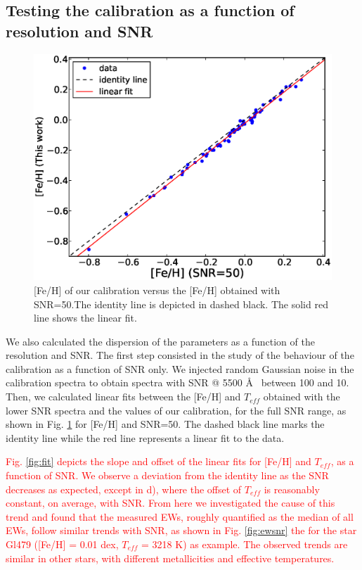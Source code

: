 \documentclass{aa}
\begin{document}
\subsection{Testing the calibration as a function of resolution and SNR}
\label{sec:testcal}

\begin{figure}[h]
\begin{center}
\includegraphics[scale=0.40]{pics/fehfehsnr.eps}
\end{center}
\caption{[Fe/H] of our calibration versus the [Fe/H] obtained with SNR=50.The identity line is depicted in dashed black. The solid red line shows the linear fit.}
\label{fig:fehfehsnr}
\end{figure}



We also calculated the dispersion of the parameters as a function of the resolution and SNR. The first step consisted in the study of the behaviour of the calibration as a function of SNR only. We injected random Gaussian noise in the calibration spectra to obtain spectra with SNR @ 5500 \AA~ between 100 and 10. Then, we calculated linear fits between the [Fe/H] and $T_{eff}$ obtained with the lower SNR spectra and the values of our calibration, for the full SNR range, as shown in Fig. \ref{fig:fehfehsnr} for [Fe/H] and SNR=50. The dashed black line marks the identity line while the red line represents a linear fit to the data. 



\textcolor{red}{Fig. \ref{fig:fit} depicts the slope and offset of the linear fits for [Fe/H] and $T_{eff}$, as a function of SNR. We observe a deviation from the identity line as the SNR decreases as expected, except in d), where the offset of $T_{eff}$ is reasonably constant, on average, with SNR. From here we investigated the cause of this trend and found that the measured EWs, roughly quantified as the median of all EWs, follow similar trends with SNR, as shown in Fig. \ref{fig:ewsnr} the for the star Gl479 ([Fe/H] = 0.01 dex, $T_{eff}$ = 3218 K) as example. The observed trends are similar in other stars, with different metallicities and effective temperatures.}
\end{document}
